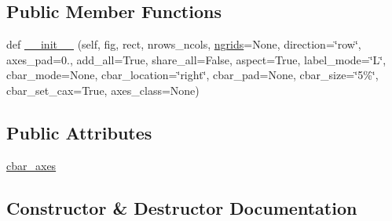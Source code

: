 \subsection*{Public Member Functions}
\begin{DoxyCompactItemize}
\item 
def \hyperlink{classaxes__grid1_1_1axes__grid_1_1ImageGrid_a4b57bd3ee05a96cf509c50b3c320599f}{\+\_\+\+\_\+init\+\_\+\+\_\+} (self, fig, rect, nrows\+\_\+ncols, \hyperlink{classaxes__grid1_1_1axes__grid_1_1Grid_ac03a9489d1bf668d1c2e7a476093cf2a}{ngrids}=None, direction=\char`\"{}row\char`\"{}, axes\+\_\+pad=0., add\+\_\+all=True, share\+\_\+all=False, aspect=True, label\+\_\+mode=\char`\"{}L\char`\"{}, cbar\+\_\+mode=None, cbar\+\_\+location=\char`\"{}right\char`\"{}, cbar\+\_\+pad=None, cbar\+\_\+size=\char`\"{}5\%\char`\"{}, cbar\+\_\+set\+\_\+cax=True, axes\+\_\+class=None)
\end{DoxyCompactItemize}
\subsection*{Public Attributes}
\begin{DoxyCompactItemize}
\item 
\hyperlink{classaxes__grid1_1_1axes__grid_1_1ImageGrid_a649c8da747abbcc29a2134c67b3b87ce}{cbar\+\_\+axes}
\end{DoxyCompactItemize}


\subsection{Constructor \& Destructor Documentation}
\mbox{\label{classaxes__grid1_1_1axes__grid_1_1ImageGrid_a4b57bd3ee05a96cf509c50b3c320599f}} 
